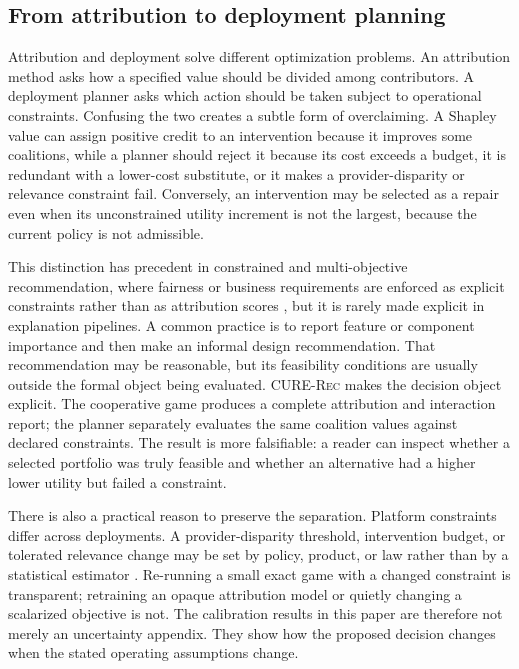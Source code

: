 \documentclass[pdflatex,sn-mathphys-num]{sn-jnl}
\theoremstyle{thmstyleone}
\theoremstyle{thmstyletwo}
\theoremstyle{thmstylethree}
\newcommand{\CURE}{\textsc{CURE-Rec}}
\begin{document}
\subsection{From attribution to deployment planning}

Attribution and deployment solve different optimization problems. An attribution method asks how a specified value should be divided among contributors. A deployment planner asks which action should be taken subject to operational constraints. Confusing the two creates a subtle form of overclaiming. A Shapley value can assign positive credit to an intervention because it improves some coalitions, while a planner should reject it because its cost exceeds a budget, it is redundant with a lower-cost substitute, or it makes a provider-disparity or relevance constraint fail. Conversely, an intervention may be selected as a repair even when its unconstrained utility increment is not the largest, because the current policy is not admissible.

This distinction has precedent in constrained and multi-objective recommendation, where fairness or business requirements are enforced as explicit constraints rather than as attribution scores \cite{wu2023multifr,chen2024interpolating}, but it is rarely made explicit in explanation pipelines. A common practice is to report feature or component importance and then make an informal design recommendation. That recommendation may be reasonable, but its feasibility conditions are usually outside the formal object being evaluated. \CURE{} makes the decision object explicit. The cooperative game produces a complete attribution and interaction report; the planner separately evaluates the same coalition values against declared constraints. The result is more falsifiable: a reader can inspect whether a selected portfolio was truly feasible and whether an alternative had a higher lower utility but failed a constraint.

There is also a practical reason to preserve the separation. Platform constraints differ across deployments. A provider-disparity threshold, intervention budget, or tolerated relevance change may be set by policy, product, or law rather than by a statistical estimator \cite{singh2018fairness,biega2018equity,ekstrand2022fairness,mehrabi2021survey,ge2020causal}. Re-running a small exact game with a changed constraint is transparent; retraining an opaque attribution model or quietly changing a scalarized objective is not. The calibration results in this paper are therefore not merely an uncertainty appendix. They show how the proposed decision changes when the stated operating assumptions change.
\end{document}
